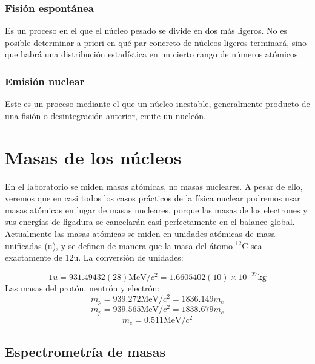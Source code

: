 \subsubsection{Fisión espontánea}

Es un proceso  en el que el núcleo pesado se divide en dos más ligeros. No es posible determinar a priori en qué par concreto de núcleos ligeros terminará, sino que habrá una distribución estadística en un cierto rango de números atómicos.

\subsubsection{Emisión nuclear}

Este es un proceso mediante el que un núcleo inestable, generalmente producto de una fisión o desintegración anterior, emite un nucleón.

\section{Masas de los núcleos}

En el laboratorio se miden masas atómicas, no masas nucleares. A pesar de ello, veremos que en casi todos los casos prácticos de la física nuclear podremos usar masas atómicas en lugar de masas nucleares, porque las masas de los electrones y sus energías de ligadura se cancelarán casi perfectamente en el balance global. Actualmente las masas atómicas se miden en unidades atómicas de masa unificadas (u), y se definen de manera que la masa del átomo $^{12}$C sea exactamente de 12u. La conversión de unidades:

\begin{equation}
	1u = 931.49432(28) \unit{\MeV/c^2} = 1.6605402(10) \times 10^{-27} \unit{\kg}
\end{equation}
Las masas del protón, neutrón y electrón:
\begin{equation}
	m_p = 939.272 \unit{\MeV/c^2} = 1836.149 m_e
\end{equation}
\begin{equation}
	m_p = 939.565 \unit{\MeV/c^2} = 1838.679 m_e
\end{equation}
\begin{equation}
	m_e = 0.511 \unit{\MeV/c^2}
\end{equation}

\subsection{Espectrometría de masas}

